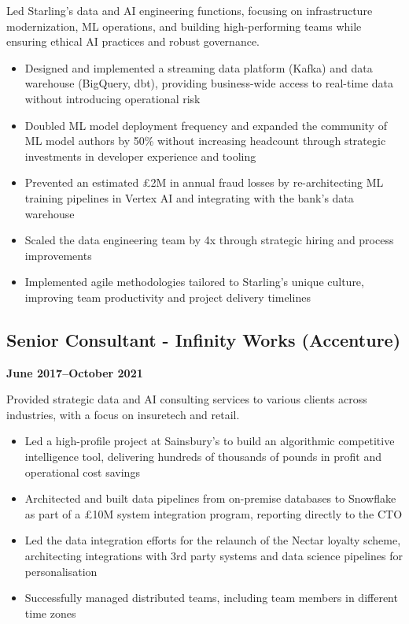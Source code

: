 \documentclass[a4paper]{scrartcl}
\begin{document}
Led Starling's data and AI engineering functions, focusing on infrastructure modernization, ML operations, and building high-performing teams while ensuring ethical AI practices and robust governance.
\begin{itemize}
	\item Designed and implemented a streaming data platform (Kafka) and data warehouse (BigQuery, dbt), providing business-wide access to real-time data without introducing operational risk
	\item Doubled ML model deployment frequency and expanded the community of ML model authors by 50\% without increasing headcount through strategic investments in developer experience and tooling
	\item Prevented an estimated £2M in annual fraud losses by re-architecting ML training pipelines in Vertex AI and integrating with the bank's data warehouse
	\item Scaled the data engineering team by 4x through strategic hiring and process improvements
	\item Implemented agile methodologies tailored to Starling's unique culture, improving team productivity and project delivery timelines
\end{itemize}

\subsection*{Senior Consultant - Infinity Works (Accenture)}
\textbf{June 2017--October 2021}

Provided strategic data and AI consulting services to various clients across industries, with a focus on insuretech and retail.
\begin{itemize}
	\item Led a high-profile project at Sainsbury's to build an algorithmic competitive intelligence tool, delivering hundreds of thousands of pounds in profit and operational cost savings
	\item Architected and built data pipelines from on-premise databases to Snowflake as part of a £10M system integration program, reporting directly to the CTO
	\item Led the data integration efforts for the relaunch of the Nectar loyalty scheme, architecting integrations with 3rd party systems and data science pipelines for personalisation
	\item Successfully managed distributed teams, including team members in different time zones
\end{itemize}
\end{document}

